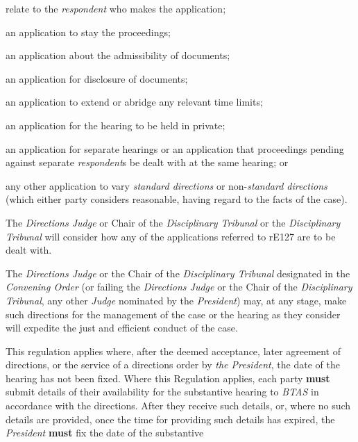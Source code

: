 relate to the \emph{respondent} who makes the application;\item an application to stay the proceedings;\item an application about the admissibility of documents;\item an application for disclosure of documents;\item an application to extend or abridge any relevant time limits;\item an application for the hearing to be held in private;\item an application for separate hearings or an application that
proceedings pending against separate \emph{respondent}s be dealt with at
the same hearing; or\item any other application to vary \emph{standard directions} or
non-\emph{standard directions} (which either party considers reasonable,
having regard to the facts of the case).\ln
{}\par
The \emph{Directions Judge} or Chair of the\emph{ Disciplinary
Tribunal} or the \emph{Disciplinary Tribunal} will consider how any of
the applications referred to rE127 are to be dealt with.\\
\par
{}
The \emph{Directions Judge} or the Chair of the\emph{ Disciplinary
Tribunal} designated in the \emph{Convening Order} (or failing
the \emph{Directions Judge} or the Chair of the\emph{ Disciplinary
Tribunal}, any other \emph{Judge} nominated by the \emph{President})
may, at any stage, make such directions for the management of the case
or the hearing as they consider will expedite the just and efficient
conduct of the case.\\
\par
{}
This regulation applies where, after the deemed acceptance, later
agreement of directions, or the service of a directions order
by \emph{the President}, the date of the hearing has not been fixed.
Where this Regulation applies, each party  \textcolor{myred}{\textbf{must}} submit details of their
availability for the substantive hearing to \emph{BTAS} in accordance
with the directions. After they receive such details, or, where no such
details are provided, once the time for providing such details has
expired, the \emph{President}  \textcolor{myred}{\textbf{must}} fix the date of the substantive
